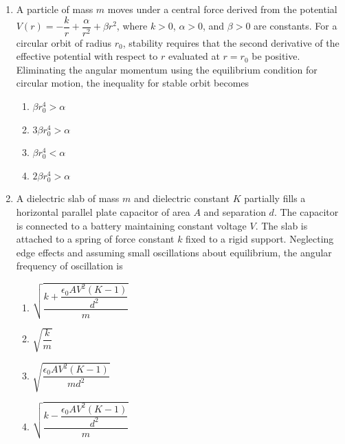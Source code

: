 \documentclass[12pt]{article}
\begin{document}
\begin{enumerate}[leftmargin=*]
\begin{enumerate}
\item $\dfrac{B^2 l^2}{R} < 2\sqrt{km}$
\item $\dfrac{B^2 l^2}{R} > 2\sqrt{km}$
\item $\dfrac{B l}{R} < \sqrt{km}$
\item $\dfrac{B^2 l}{R} < \sqrt{km}$
\end{enumerate}

\item A particle of mass $m$ moves under a central force derived from the potential 
$V(r)= -\dfrac{k}{r} + \dfrac{\alpha}{r^2} + \beta r^2$, 
where $k>0$, $\alpha>0$, and $\beta>0$ are constants. For a circular orbit of radius $r_0$, stability requires that the second derivative of the effective potential with respect to $r$ evaluated at $r=r_0$ be positive. Eliminating the angular momentum using the equilibrium condition for circular motion, the inequality for stable orbit becomes

\begin{enumerate}
\item $\beta r_0^4 > \alpha$
\item $3\beta r_0^4 > \alpha$
\item $\beta r_0^4 < \alpha$
\item $2\beta r_0^4 > \alpha$
\end{enumerate}

\item A dielectric slab of mass $m$ and dielectric constant $K$ partially fills a horizontal parallel plate capacitor of area $A$ and separation $d$. The capacitor is connected to a battery maintaining constant voltage $V$. The slab is attached to a spring of force constant $k$ fixed to a rigid support. Neglecting edge effects and assuming small oscillations about equilibrium, the angular frequency of oscillation is

\begin{enumerate}
\item $\sqrt{\dfrac{k + \dfrac{\epsilon_0 A V^2 (K-1)}{d^2}}{m}}$
\item $\sqrt{\dfrac{k}{m}}$
\item $\sqrt{\dfrac{\epsilon_0 A V^2 (K-1)}{m d^2}}$
\item $\sqrt{\dfrac{k - \dfrac{\epsilon_0 A V^2 (K-1)}{d^2}}{m}}$
\end{enumerate}


\end{enumerate}
\end{document}
